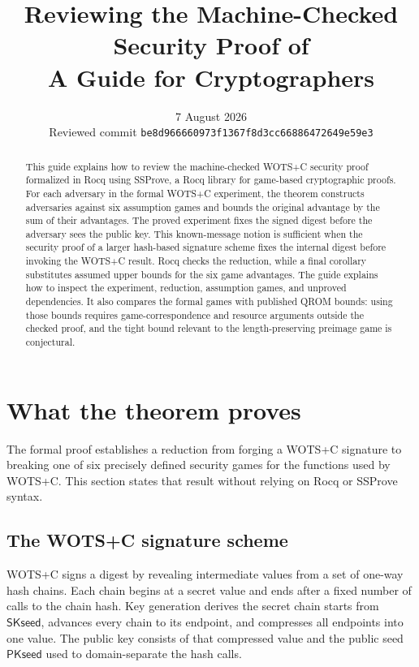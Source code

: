 \documentclass[11pt,a4paper]{article}
\title{\textbf{Reviewing the Machine-Checked Security Proof of \WOTSC}\\[4pt]
       {\large A Guide for Cryptographers}}
\author{}
\date{7 August 2026\\[2pt]
      \small Reviewed commit \texttt{be8d966660973f1367f8d3cc66886472649e59e3}}
\theoremstyle{plain}
\theoremstyle{definition}
\newcommand{\SSProve}{\textsf{SSProve}\xspace}
\newcommand{\Rocq}{\textsf{Rocq}\xspace}
\newcommand{\WOTSC}{\textsf{WOTS+C}\xspace}
\newcommand{\PKseed}{\ensuremath{\mathsf{PKseed}}\xspace}
\newcommand{\SKseed}{\ensuremath{\mathsf{SKseed}}\xspace}
\begin{document}
\maketitle

\begin{abstract}
This guide explains how to review the machine-checked \WOTSC security proof formalized in \Rocq using \SSProve, a Rocq library for game-based cryptographic proofs.
For each adversary in the formal \WOTSC experiment, the theorem constructs adversaries against six assumption games and bounds the original advantage by the sum of their advantages.
The proved experiment fixes the signed digest before the adversary sees the public key.
This known-message notion is sufficient when the security proof of a larger hash-based signature scheme fixes the internal digest before invoking the \WOTSC result.
Rocq checks the reduction, while a final corollary substitutes assumed upper bounds for the six game advantages.
The guide explains how to inspect the experiment, reduction, assumption games, and unproved dependencies.
It also compares the formal games with published QROM bounds: using those bounds requires game-correspondence and resource arguments outside the checked proof, and the tight bound relevant to the length-preserving preimage game is conjectural.
\end{abstract}

\tableofcontents
\newpage

\section{What the theorem proves}
\label{sec:claim}

The formal proof establishes a reduction from forging a \WOTSC signature to breaking one of six precisely defined security games for the functions used by \WOTSC.
This section states that result without relying on Rocq or \SSProve syntax.

\subsection{The \WOTSC signature scheme}

\WOTSC signs a digest by revealing intermediate values from a set of one-way hash chains.
Each chain begins at a secret value and ends after a fixed number of calls to the chain hash.
Key generation derives the secret chain starts from \(\SKseed\), advances every chain to its endpoint, and compresses all endpoints into one value.
The public key consists of that compressed value and the public seed \(\PKseed\) used to domain-separate the hash calls.
\end{document}
